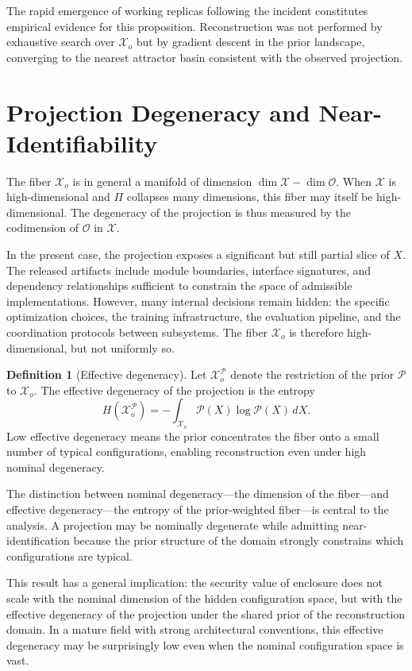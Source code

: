 \documentclass[12pt, oneside]{article}
\theoremstyle{plain}
\theoremstyle{definition}
\newtheorem{definition}[theorem]{Definition}
\theoremstyle{remark}
\newcommand{\proj}{\Pi}
\newcommand{\config}{\mathcal{X}}
\newcommand{\obs}{\mathcal{O}}
\newcommand{\prior}{\mathcal{P}}
\begin{document}
The rapid emergence of working replicas following the incident constitutes empirical evidence
for this proposition. Reconstruction was not performed by exhaustive search over $\config_o$
but by gradient descent in the prior landscape, converging to the nearest attractor basin
consistent with the observed projection.

\section{Projection Degeneracy and Near-Identifiability}

The fiber $\config_o$ is in general a manifold of dimension $\dim \config - \dim \obs$.
When $\config$ is high-dimensional and $\proj$ collapses many dimensions, this fiber may
itself be high-dimensional. The degeneracy of the projection is thus measured by the
codimension of $\obs$ in $\config$.

In the present case, the projection exposes a significant but still partial slice of $X$.
The released artifacts include module boundaries, interface signatures, and dependency
relationships sufficient to constrain the space of admissible implementations. However, many
internal decisions remain hidden: the specific optimization choices, the training
infrastructure, the evaluation pipeline, and the coordination protocols between subsystems.
The fiber $\config_o$ is therefore high-dimensional, but not uniformly so.

\begin{definition}[Effective degeneracy]
Let $\config_o^{\prior}$ denote the restriction of the prior $\prior$ to $\config_o$.
The effective degeneracy of the projection is the entropy
\[
  H(\config_o^{\prior}) = -\int_{\config_o} \prior(X) \log \prior(X) \, dX.
\]
Low effective degeneracy means the prior concentrates the fiber onto a small number of
typical configurations, enabling reconstruction even under high nominal degeneracy.
\end{definition}

The distinction between nominal degeneracy---the dimension of the fiber---and effective
degeneracy---the entropy of the prior-weighted fiber---is central to the analysis. A
projection may be nominally degenerate while admitting near-identification because the
prior structure of the domain strongly constrains which configurations are typical.

This result has a general implication: the security value of enclosure does not scale with
the nominal dimension of the hidden configuration space, but with the effective degeneracy
of the projection under the shared prior of the reconstruction domain. In a mature field
with strong architectural conventions, this effective degeneracy may be surprisingly low
even when the nominal configuration space is vast.
\end{document}
